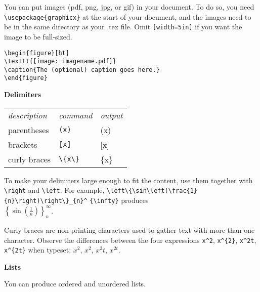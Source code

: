 \documentclass[10pt,landscape]{article}
\newcommand{\ColorSection}[1]{\par\vspace{1.5ex}\noindent\textcolor{sectioncolor}{\Large\bfseries #1}\par\vspace{0.75ex}}
\begin{document}
\begin{multicols}{3}
You can put images (pdf, png, jpg, or gif) in your document. To do so, you need \verb!\usepackage{graphicx}! at the start of your document, and the images need to be in the same directory as your .tex file. Omit   \verb![width=5in]! if you want the image to be full-sized.

\verb!\begin{figure}[ht]!\\
\verb!\texttt{[image: imagename.pdf]}!\\
\verb!\caption{The (optional) caption goes here.}!\\
\verb!\end{figure}!



\ColorSection{Delimiters}

\begin{tabular}{lll}
\emph{description} & \emph{command} & \emph{output}\\
parentheses &\verb!(x)! & (x)\\
brackets &\verb![x]! & [x]\\
curly braces& \verb!\{x\}! & \{x\}\\
\end{tabular}

To make your delimiters large enough to fit the content, use them together with \verb!\right! and \verb!\left!. For example, \verb!\left\{\sin\left(\frac{1}{n}\right)\right\}_{n}^! \verb!{\infty}! produces\\ \(\displaystyle \left\{\sin\left(\frac{1}{n}\right)\right\}_{n}^{\infty}\).

Curly braces are non-printing characters used to gather text with more than one character. Observe the differences between the four expressions \verb!x^2!, \verb!x^{2}!, \verb!x^2t!, \verb!x^{2t}! when typeset: \(x^2\), \(x^{2}\), \(x^2t\), \(x^{2t}\).

\columnbreak
\ColorSection{Lists}

You can produce ordered and unordered lists.


\end{multicols}
\end{document}
